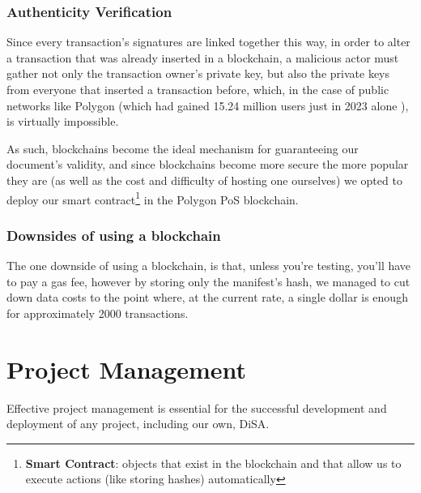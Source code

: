 \documentclass[a4paper,11pt]{article}
\begin{document}
                \subsubsection{Authenticity Verification} 
                    \quad Since every transaction's signatures are linked together this way, in order to alter a transaction that was already inserted in a blockchain, a malicious actor must gather not only the transaction owner's private key, but also the private keys from everyone that inserted a transaction before, which, in the case of public networks like Polygon (which had gained 15.24 million users just in 2023 alone \cite{polygonUserCount}), is virtually impossible.
                        
                    \quad As such, blockchains become the ideal mechanism for guaranteeing our document's validity, and since blockchains become more secure the more popular they are (as well as the cost and difficulty of hosting one ourselves) we opted to deploy our smart contract\footnote{\textbf{Smart Contract}: objects that exist in the blockchain and that allow us to execute actions (like storing hashes) automatically} in the Polygon PoS blockchain. 
            
                \subsubsection{Downsides of using a blockchain} 
                    \quad The one downside of using a blockchain, is that, unless you're testing, you'll have to pay a gas fee, however by storing only the manifest's hash, we managed to cut down data costs to the point where, at the current rate, a single dollar is enough for approximately 2000 transactions.
    
    \clearpage
    \section{Project Management}
        \quad Effective project management is essential for the successful development and deployment of any project, including our own, DiSA.
        
\end{document}
